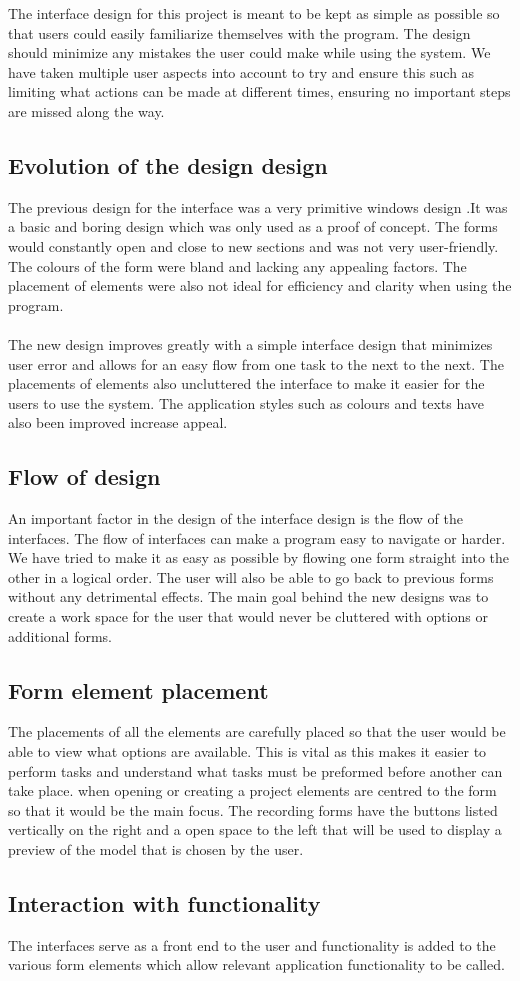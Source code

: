 The interface design for this project is meant to be kept as simple as possible so that users could easily familiarize themselves with the program. The design should minimize any mistakes the user could make while using the system. We have taken multiple user aspects into account to try and ensure this such as limiting what actions can be made at different times, ensuring no important steps are missed along the way.

\subsection{Evolution of the design design}
The previous design for the interface was a very primitive windows design .It was a basic and boring design which was only used as a proof of concept. The forms would constantly open and close to new sections and was not very user-friendly. The colours of the form were bland and lacking any appealing factors. The placement of elements were also not ideal for efficiency and clarity when using the program.\\
\\
The new design improves greatly with a simple interface design that minimizes user error and allows for an easy flow from one task to the next to the next. The placements of elements also uncluttered the interface to make it easier for the users to use the system. The application styles such as colours and texts have also been improved increase appeal.

\subsection{Flow of design}
An important factor in the design of the interface design is the flow of the interfaces. The flow of interfaces can make a program easy to navigate or harder. We have tried to make it as easy as possible by flowing one form straight into the other in a logical order. The user will also be able to go back to previous forms without any detrimental effects. The main goal behind the new designs was to create a work space for the user that would never be cluttered with options or additional forms. 

\subsection{Form element placement}
The placements of all the elements are carefully placed so that the user would be able to view what options are available. This is vital as this makes it easier to perform tasks and understand what tasks must be preformed before another can take place. when opening or creating a project elements are centred to the form so that it would be the main focus. The recording forms have the buttons listed vertically on the right and a open space to the left that will be used to display a preview of the model that is chosen by the user.

\subsection{Interaction with functionality}
The interfaces serve as a front end to the user and functionality is added to the various form elements which allow relevant application functionality to be called. 